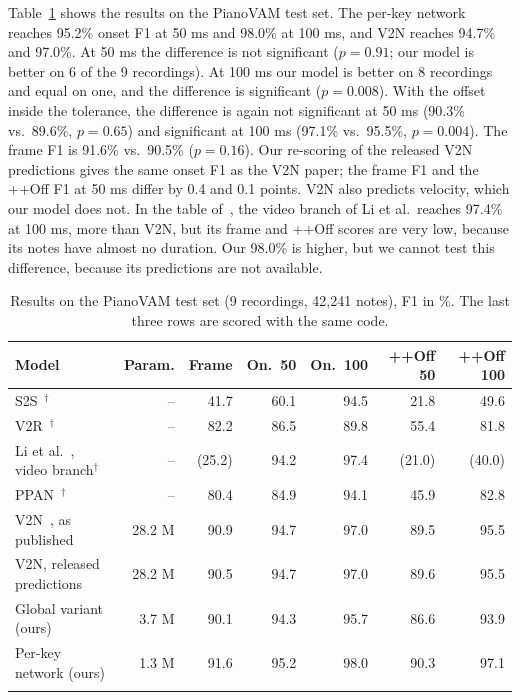 \documentclass[pdflatex,sn-mathphys-num]{sn-jnl}
\begin{document}
Table~\ref{tab:vam} shows the results on the PianoVAM test set. The per-key network reaches 95.2\% onset F1 at 50 ms and 98.0\% at 100 ms, and V2N reaches 94.7\% and 97.0\%. At 50 ms the difference is not significant ($p=0.91$; our model is better on 6 of the 9 recordings). At 100 ms our model is better on 8 recordings and equal on one, and the difference is significant ($p=0.008$). With the offset inside the tolerance, the difference is again not significant at 50 ms (90.3\% vs.\ 89.6\%, $p=0.65$) and significant at 100 ms (97.1\% vs.\ 95.5\%, $p=0.004$). The frame F1 is 91.6\% vs.\ 90.5\% ($p=0.16$). Our re-scoring of the released V2N predictions gives the same onset F1 as the V2N paper; the frame F1 and the ++Off F1 at 50 ms differ by 0.4 and 0.1 points. V2N also predicts velocity, which our model does not. In the table of~\cite{kim2026v2n}, the video branch of Li et al.\ reaches 97.4\% at 100 ms, more than V2N, but its frame and ++Off scores are very low, because its notes have almost no duration. Our 98.0\% is higher, but we cannot test this difference, because its predictions are not available.

\begin{table}[h]
\caption{Results on the PianoVAM test set (9 recordings, 42,241 notes), F1 in \%. The last three rows are scored with the same code.}\label{tab:vam}
\begin{tabular}{@{}lrrrrrr@{}}
\toprule
Model & Param. & Frame & On.\ 50 & On.\ 100 & ++Off 50 & ++Off 100 \\
\midrule
S2S~\cite{koepke2020}$^{\dagger}$ & -- & 41.7 & 60.1 & 94.5 & 21.8 & 49.6 \\
V2R~\cite{su2020}$^{\dagger}$ & -- & 82.2 & 86.5 & 89.8 & 55.4 & 81.8 \\
Li et al.~\cite{li2024}, video branch$^{\dagger}$ & -- & (25.2) & 94.2 & 97.4 & (21.0) & (40.0) \\
PPAN~\cite{zivanovic2025}$^{\dagger}$ & -- & 80.4 & 84.9 & 94.1 & 45.9 & 82.8 \\
V2N~\cite{kim2026v2n}, as published & 28.2 M & 90.9 & 94.7 & 97.0 & 89.5 & 95.5 \\
\midrule
V2N, released predictions & 28.2 M & 90.5 & 94.7 & 97.0 & 89.6 & 95.5 \\
Global variant (ours) & 3.7 M & 90.1 & 94.3 & 95.7 & 86.6 & 93.9 \\
Per-key network (ours) & 1.3 M & 91.6 & 95.2 & 98.0 & 90.3 & 97.1 \\
\botrule
\end{tabular}
\end{table}
\end{document}
